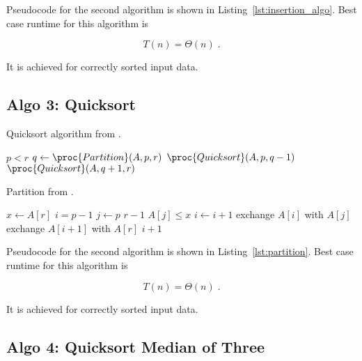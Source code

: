 Pseudocode for the second algorithm is shown in
Listing~\ref{lst:insertion_algo}. Best case runtime for this algorithm
is

\begin{equation}
  T(n) = \Theta(n) \;.  \label{eq:ins_sort_best}
\end{equation}

It is achieved for correctly sorted input data.

\subsection{Algo 3: Quicksort}\label{sec:algo3}

\begin{algorithm}[H]
  \caption{Quicksort algorithm from \cite[Ch.~2.1]{cormen_introduction_2009}.}
  \label{lst:quicksort_algo}
  \begin{codebox}
    \li \If $p < r$
    \li \Then $q \gets \proc{Partition}(A, p, r)$
    \li     $\proc{Quicksort}(A, p, q - 1)$
    \li     $\proc{Quicksort}(A, q + 1, r)$
    \End
  \end{codebox}
\end{algorithm}

\begin{algorithm}[H]
  \caption{Partition from \cite[Ch.~2.1]{cormen_introduction_2009}.}
  \label{lst:partition}
  \begin{codebox}
    \li $x \gets A[r]$
    \li $i = p - 1$
    \li \For $j \gets p$ \To $r - 1$
    \li \Do \If $A[j] \le x$
    \li  	\Then $i \gets i + 1$
    \li     exchange $A[i]$ with $A[j]$
    \End
    \End
    \li exchange $A[i + 1]$ with $A[r]$
    \li \Return $i + 1$
  \end{codebox}
\end{algorithm}

Pseudocode for the second algorithm is shown in
Listing~\ref{lst:partition}. Best case runtime for this algorithm
is

\begin{equation}
  T(n) = \Theta(n) \;.  \label{eq:ins_sort_best}
\end{equation}

It is achieved for correctly sorted input data.

\subsection{Algo 4: Quicksort Median of Three}\label{sec:algo4}

